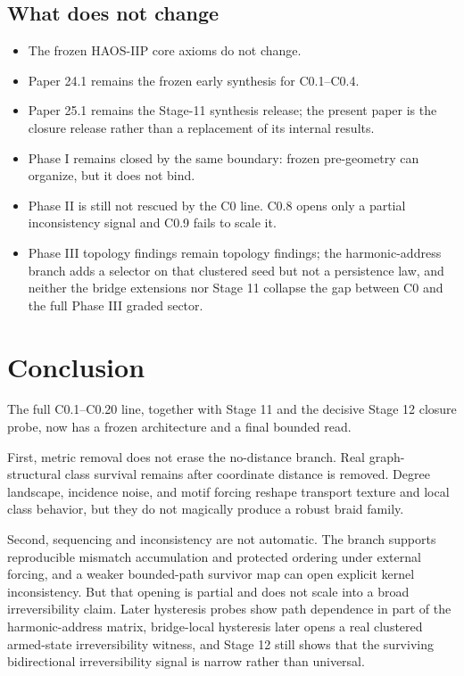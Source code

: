 \documentclass[11pt]{article}
\begin{document}
\subsection{What does not change}

\begin{itemize}
\item The frozen HAOS-IIP core axioms do not change.
\item Paper 24.1 remains the frozen early synthesis for C0.1--C0.4.
\item Paper 25.1 remains the Stage-11 synthesis release; the present paper is the closure release rather than a replacement of its internal results.
\item Phase I remains closed by the same boundary: frozen pre-geometry can organize, but it does not bind.
\item Phase II is still not rescued by the C0 line. C0.8 opens only a partial inconsistency signal and C0.9 fails to scale it.
\item Phase III topology findings remain topology findings; the harmonic-address branch adds a selector on that clustered seed but not a persistence law, and neither the bridge extensions nor Stage 11 collapse the gap between C0 and the full Phase III graded sector.
\end{itemize}

\section{Conclusion}

The full C0.1--C0.20 line, together with Stage 11 and the decisive Stage 12 closure probe, now has a frozen architecture and a final bounded read.

First, metric removal does not erase the no-distance branch. Real graph-structural class survival remains after coordinate distance is removed. Degree landscape, incidence noise, and motif forcing reshape transport texture and local class behavior, but they do not magically produce a robust braid family.

Second, sequencing and inconsistency are not automatic. The branch supports reproducible mismatch accumulation and protected ordering under external forcing, and a weaker bounded-path survivor map can open explicit kernel inconsistency. But that opening is partial and does not scale into a broad irreversibility claim. Later hysteresis probes show path dependence in part of the harmonic-address matrix, bridge-local hysteresis later opens a real clustered armed-state irreversibility witness, and Stage 12 still shows that the surviving bidirectional irreversibility signal is narrow rather than universal.
\end{document}

